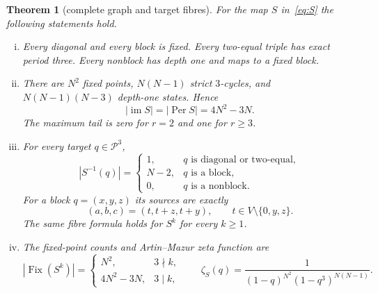 \documentclass[a4paper,10pt]{amsart}
\newtheorem{theorem}{Theorem}
\theoremstyle{remark}
\newcommand{\cP}{\mathcal P}
\newcommand{\Fix}{\operatorname{Fix}}
\newcommand{\imof}{\operatorname{im}}
\begin{document}
\begin{theorem}[complete graph and target fibres]\label{thm:main}
For the map $S$ in~\eqref{eq:S} the following statements hold.
\begin{enumerate}[(i)]
\item Every diagonal and every block is fixed.  Every two-equal triple has
exact period three.  Every nonblock has depth one and maps to a fixed block.
\item There are $N^2$ fixed points, $N(N-1)$ strict $3$-cycles, and
$N(N-1)(N-3)$ depth-one states.  Hence
\begin{equation}\label{eq:periodic}
 |\imof S|=|\operatorname{Per}S|=4N^2-3N.
\end{equation}
The maximum tail is zero for $r=2$ and one for $r\ge3$.
\item For every target $q\in\cP^3$,
\begin{equation}\label{eq:fibres}
 |S^{-1}(q)|=
 \begin{cases}
 1,&q\text{ is diagonal or two-equal},\\
 N-2,&q\text{ is a block},\\
 0,&q\text{ is a nonblock}.
 \end{cases}
\end{equation}
For a block $q=(x,y,z)$ its sources are exactly
\begin{equation}\label{eq:param}
 (a,b,c)=(t,t+z,t+y),\qquad t\in V\setminus\{0,y,z\}.
\end{equation}
The same fibre formula holds for $S^k$ for every $k\ge1$.
\item The fixed-point counts and Artin--Mazur zeta function are
\begin{equation}\label{eq:fixk}
 |\Fix(S^k)|=
 \begin{cases}N^2,&3\nmid k,\\4N^2-3N,&3\mid k,
 \end{cases}
 \qquad
 \zeta_S(q)=\frac1{(1-q)^{N^2}(1-q^3)^{N(N-1)}}.
\end{equation}
\end{enumerate}
\end{theorem}
\end{document}
